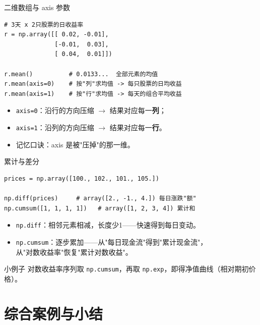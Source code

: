 \documentclass[9pt]{ctexbeamer}
\begin{document}
\begin{frame}[fragile]{二维数组与 axis 参数}
	\begin{lstlisting}
# 3天 x 2只股票的日收益率
r = np.array([[ 0.02, -0.01],
              [-0.01,  0.03],
              [ 0.04,  0.01]])

r.mean()          # 0.0133...  全部元素的均值
r.mean(axis=0)    # 按"列"求均值 -> 每只股票的日均收益
r.mean(axis=1)    # 按"行"求均值 -> 每天的组合平均收益
\end{lstlisting}
	\begin{itemize}
		\item \texttt{axis=0}：沿行的方向压缩 $\rightarrow$ 结果对应每一\textbf{列}；
		\item \texttt{axis=1}：沿列的方向压缩 $\rightarrow$ 结果对应每一\textbf{行}。
		\item 记忆口诀：\alert{axis 是被"压掉"的那一维}。
	\end{itemize}
\end{frame}

\begin{frame}[fragile]{累计与差分}
	\begin{lstlisting}
prices = np.array([100., 102., 101., 105.])

np.diff(prices)     # array([2., -1., 4.]) 每日涨跌"额"
np.cumsum([1, 1, 1, 1])   # array([1, 2, 3, 4]) 累计和
\end{lstlisting}
	\begin{itemize}
		\item \texttt{np.diff}：相邻元素相减，长度少1——快速得到每日变动。
		\item \texttt{np.cumsum}：逐步累加——从"每日现金流"得到"累计现金流"，\\
			从"对数收益率"恢复"累计对数收益"。
	\end{itemize}
	\begin{exampleblock}{小例子}
		对数收益率序列取 \texttt{np.cumsum}，再取 \texttt{np.exp}，即得净值曲线（相对期初价格）。
	\end{exampleblock}
\end{frame}


\section{综合案例与小结}
\end{document}
